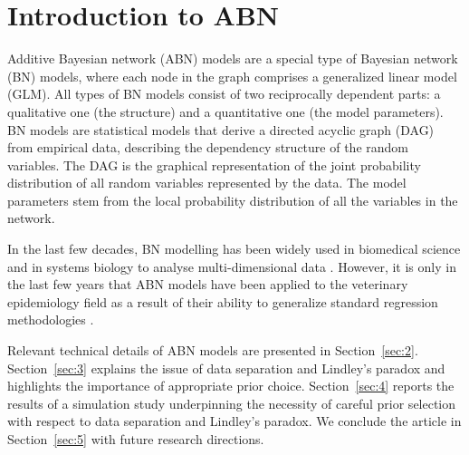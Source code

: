 \documentclass{svproc}
\newcommand{\MP}[1]{\textcolor{red}{#1}}
\newcommand{\rf}[1]{\textcolor{green}{#1}}
\begin{document}
\section{Introduction to ABN}
\label{sec:1}
Additive Bayesian network (ABN) models are a special type of   Bayesian network (BN) models, where
each node in the graph comprises a generalized linear model (GLM).
All types of BN models consist of two reciprocally dependent parts: a
qualitative one (the structure) and a quantitative one (the model parameters).
BN models are statistical models that derive a directed acyclic graph (DAG) from empirical data,
describing the dependency structure of the random variables. The DAG is the graphical representation of the joint
probability distribution of all random variables represented by the data. The model parameters stem from  the local probability distribution of all the variables in the network.  %

In the last few decades, BN modelling has been widely used in biomedical science and in systems biology to analyse multi-dimensional data \cite{Jansen2003,Dojer2006,Poon2007,Djebbari2008,Hodges2010}.
However, it is only in the last few years that ABN models have been applied to the veterinary epidemiology field as a result of their ability to
generalize standard regression methodologies \cite{Lewis2012, Hartnack2016, Pittavino2017a}.


Relevant technical details of ABN models are presented in Section~\ref{sec:2}. 
Section~\ref{sec:3} explains the issue of data separation and Lindley's paradox and highlights the importance of appropriate prior choice. 
Section~\ref{sec:4} reports the results of a simulation study underpinning the necessity of careful prior selection with respect to data separation and Lindley's paradox. 
We conclude the article in Section~\ref{sec:5} with future research directions. 


\end{document}
